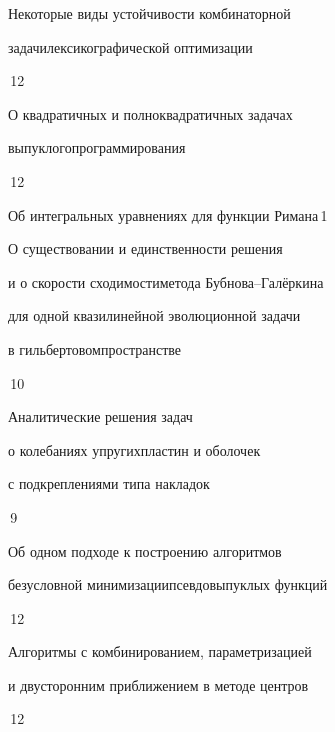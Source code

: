 {Некоторые виды устойчивости комбинаторной


задачи\newline лексикографической оптимизации}{\No\,12}






{О квадратичных и полноквадратичных задачах


выпуклого\newline программирования}{\No\,12}










{Об интегральных уравнениях для функции Римана}{\No\,1}




{О существовании и единственности решения 


и о скорости сходимости\newline метода Бубнова--Гал\"еркина 


для одной квазилинейной эволюционной задачи 


в гильбертовом\newline пространстве}{\No\,10}




{Аналитические решения задач


о колебаниях упругих\newline пластин и оболочек


с подкреплениями типа накладок}{\No\,9}




{Об одном подходе к построению алгоритмов


безусловной минимизации\newline псевдовыпуклых функций}{\No\,12}




{Алгоритмы с комбинированием, параметризацией\newline


и двусторонним приближением в методе центров}{\No\,12}


